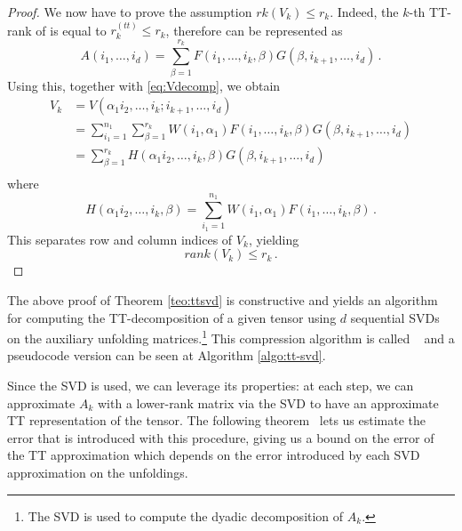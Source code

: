 \begin{Teo}
\begin{proof}
    We now have to prove the assumption $rk(V_k) \leq r_k$. Indeed, the $k$-th TT-rank of \A is equal to $r^{(tt)}_k \leq r_k$, therefore \A can be represented as
    \begin{equation*}
      A(i_1,\ldots,i_d) = \sum_{\beta=1}^{r_k} F(i_1,\ldots,i_k,\beta) G(\beta,i_{k+1},\ldots,i_d)\, .
    \end{equation*}
    Using this, together with \eqref{eq:Vdecomp}, we obtain
    \begin{align*}
      V_k &= V(\alpha_1 i_2,\ldots,i_k;i_{k+1},\ldots,i_d) \\
      &= \sum_{i_1 = 1}^{n_1} \sum_{\beta = 1}^{r_k} W(i_1, \alpha_1) F(i_1,\ldots,i_k,\beta) G(\beta,i_{k+1},\ldots,i_d) \\
      &= \sum_{\beta = 1}^{r_k} H(\alpha_1 i_2,\ldots,i_k,\beta) G(\beta,i_{k+1},\ldots,i_d) \\
    \end{align*}
    where
    \begin{equation*}
      H(\alpha_1 i_2,\ldots,i_k,\beta) = \sum_{i_1 = 1}^{n_1} W(i_1, \alpha_1) F(i_1,\ldots,i_k,\beta)\, .
    \end{equation*}
    This separates row and column indices of $V_k$, yielding
    \begin{equation*}
      rank(V_k) \leq r_k\, .
    \end{equation*}
  \end{proof}
  
\end{Teo}

The above proof of Theorem \ref{teo:ttsvd} is constructive and yields an algorithm for computing the TT-decomposition of a given tensor using $d$ sequential SVDs on the auxiliary unfolding matrices.\footnote{The SVD is used to compute the dyadic decomposition of $A_k$.} This  compression algorithm is called ~\cite{oseledets2011tt} and a pseudocode version can be seen at Algorithm \ref{algo:tt-svd}.

Since the SVD is used, we can leverage its properties: at each step, we can approximate $A_k$ with a lower-rank matrix via the SVD to have an approximate TT representation of the tensor. The following theorem~\cite{oseledets2011tt} lets us estimate the error that is introduced with this procedure, giving us a bound on the error of the TT approximation which depends on the error introduced by each SVD approximation on the unfoldings.

